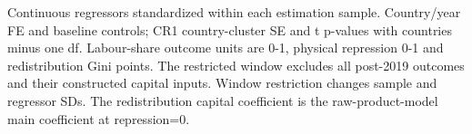 \begin{table}[htbp]\centering
\caption{Capital associations before the post-2019 capital extension}
\label{tab:measurement_observed}
\small
{}
\begin{tablenotes}\footnotesize Continuous regressors standardized within each estimation sample. Country/year FE and baseline controls; CR1 country-cluster SE and t p-values with countries minus one df. Labour-share outcome units are 0-1, physical repression 0-1 and redistribution Gini points. The restricted window excludes all post-2019 outcomes and their constructed capital inputs. Window restriction changes sample and regressor SDs. The redistribution capital coefficient is the raw-product-model main coefficient at repression=0.\end{tablenotes}
\end{table}